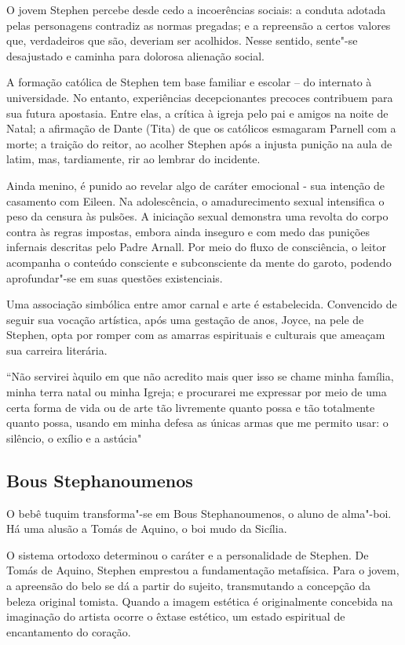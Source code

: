 O jovem Stephen percebe desde cedo a incoerências sociais: a conduta
adotada pelas personagens contradiz as normas pregadas; e a repreensão a
certos valores que, verdadeiros que são, deveriam ser acolhidos. Nesse
sentido, sente"-se desajustado e caminha para dolorosa alienação social.

A formação católica de Stephen tem base familiar e escolar -- do
internato à universidade. No entanto, experiências decepcionantes
precoces contribuem para sua futura apostasia. Entre elas, a crítica à
igreja pelo pai e amigos na noite de Natal; a afirmação de Dante (Tita)
de que os católicos esmagaram Parnell com a morte; a traição do reitor,
ao acolher Stephen após a injusta punição na aula de latim, mas,
tardiamente, rir ao lembrar do incidente.

Ainda menino, é punido ao revelar algo de caráter emocional - sua
intenção de casamento com Eileen. Na adolescência, o amadurecimento
sexual intensifica o peso da censura às pulsões. A iniciação sexual
demonstra uma revolta do corpo contra às regras impostas, embora ainda
inseguro e com medo das punições infernais descritas pelo Padre Arnall.
Por meio do fluxo de consciência, o leitor acompanha o conteúdo
consciente e subconsciente da mente do garoto, podendo aprofundar"-se em
suas questões existenciais.

Uma associação simbólica entre amor carnal e arte é estabelecida.
Convencido de seguir sua vocação artística, após uma gestação de anos,
Joyce, na pele de Stephen, opta por romper com as amarras espirituais e
culturais que ameaçam sua carreira literária.

``Não servirei àquilo em que não acredito mais quer isso se chame minha
família, minha terra natal ou minha Igreja; e procurarei me expressar
por meio de uma certa forma de vida ou de arte tão livremente quanto
possa e tão totalmente quanto possa, usando em minha defesa as únicas
armas que me permito usar: o silêncio, o exílio e a astúcia"

\subsection{Bous Stephanoumenos}

O bebê tuquim transforma"-se em Bous Stephanoumenos, o aluno de alma"-boi.
Há uma alusão a Tomás de Aquino, o boi mudo da Sicília.

O sistema ortodoxo determinou o caráter e a personalidade de Stephen. De
Tomás de Aquino, Stephen emprestou a fundamentação metafísica. Para o
jovem, a apreensão do belo se dá a partir do sujeito, transmutando a
concepção da beleza original tomista. Quando a imagem estética é
originalmente concebida na imaginação do artista ocorre o êxtase
estético, um estado espiritual de encantamento do coração.

